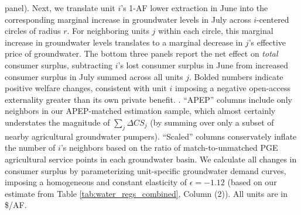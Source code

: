 \begin{table}
{panel). Next, we translate unit $i$'s 1-AF lower extraction in June into the corresponding marginal increase in groundwater  
levels in July across $i$-centered circles of radius $r$. For neighboring units $j$ within each circle, this marginal increase  
in groundwater levels translates to a marginal decrease in $j$'s effective price of groundwater. The bottom three panels report  
the net effect on \emph{total} consumer surplus, subtracting $i$'s lost consumer surplus in June from increased consumer surplus  
in July summed across all units $j$. Bolded numbers indicate positive welfare changes, consistent with unit $i$ imposing a negative  
open-access externality greater than its own private benefit. . ``APEP'' columns include only neighbors in our APEP-matched estimation sample, which almost certainly  
understates the magnitude of $ \sum_j \Delta CS_j$ (by summing over only a subset of nearby agricultural groundwater pumpers).  
``Scaled'' columns conservately inflate the number of $i$'s neighbors based on the ratio of match-to-unmatched PGE agricultural  
service points in each groundwater basin. We calculate all changes in consumer surplus by parameterizing unit-specific groundwater  
demand curves, imposing a homogeneous and constant elasticity of $\epsilon = -1.12$ (based on our estimate from Table  
\ref{tab:water_regs_combined}, Column (2)). All units are in \$/AF. 
}
\end{table}

